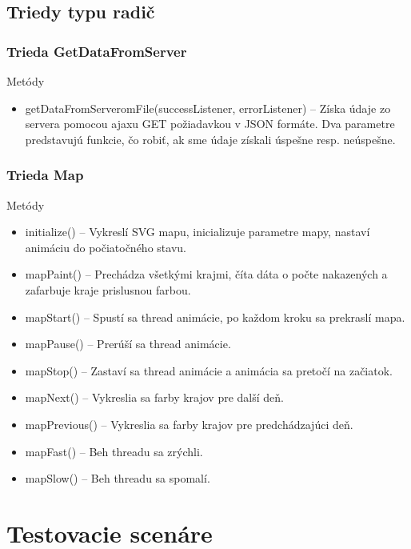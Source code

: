 \documentclass[12pt,a4paper]{report}
\begin{document}
\section[Triedy typu radič]{\rmfamily\bfseries
	Triedy typu radič}

\subsection[Trieda GetDataFromServer]{\rmfamily\bfseries
	Trieda GetDataFromServer}
Metódy
\begin{itemize}
	\item getDataFromServeromFile(successListener, errorListener) – Získa údaje zo servera pomocou ajaxu GET požiadavkou v JSON formáte. Dva parametre predstavujú funkcie, čo robiť, ak sme údaje získali úspešne resp. neúspešne.
\end{itemize}

\subsection[Trieda Map]{\rmfamily\bfseries
	Trieda Map}

Metódy
\begin{itemize}
	\item initialize() – Vykreslí SVG mapu, inicializuje parametre mapy, nastaví animáciu do počiatočného stavu.
	\item mapPaint() – Prechádza všetkými krajmi, číta dáta o počte nakazených a zafarbuje kraje prislusnou farbou.
	\item mapStart() – Spustí sa thread animácie, po každom kroku sa prekraslí mapa.
	\item mapPause() – Prerúší sa thread animácie.
	\item mapStop() – Zastaví sa thread animácie a animácia sa pretočí na začiatok.
	\item mapNext() – Vykreslia sa farby krajov pre další deň.
	\item mapPrevious() – Vykreslia sa farby krajov pre predchádzajúci deň.
	\item mapFast() – Beh threadu sa zrýchli.
	\item mapSlow() – Beh threadu sa spomalí.
\end{itemize}

\chapter[Testovacie scenáre]{\rmfamily\bfseries
	Testovacie scenáre}
\end{document}

